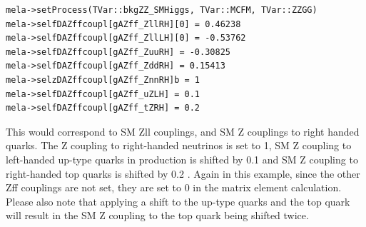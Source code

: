 \documentclass[aps,superscriptaddress,nofootinbib]{revtex4}
\begin{document}
\begin{verbatim}
mela->setProcess(TVar::bkgZZ_SMHiggs, TVar::MCFM, TVar::ZZGG)
mela->selfDAZffcoupl[gAZff_ZllRH][0] = 0.46238
mela->selfDAZffcoupl[gAZff_ZllLH][0] = -0.53762
mela->selfDAZffcoupl[gAZff_ZuuRH] = -0.30825
mela->selfDAZffcoupl[gAZff_ZddRH] = 0.15413
mela->selzDAZffcoupl[gAZff_ZnnRH]b = 1
mela->selfDAZffcoupl[gAZff_uZLH] = 0.1 
mela->selfDAZffcoupl[gAZff_tZRH] = 0.2
\end{verbatim}

This would correspond to SM Zll couplings, and SM Z couplings to right handed quarks. The Z coupling to right-handed neutrinos is set to 1, SM Z coupling to left-handed
up-type quarks in production is shifted by 0.1 and SM Z coupling to right-handed top quarks is shifted by 0.2 . Again in this example, since the other Zff couplings are not set, they are set to 0 in the matrix element calculation. Please also note that applying a shift to the up-type quarks and the top quark will result in the SM Z coupling to the top quark being shifted twice.
\end{document}

